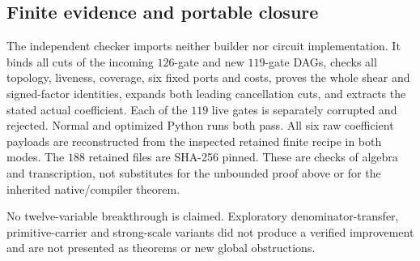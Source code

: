 \subsection{Finite evidence and portable closure}
The independent checker imports neither builder nor circuit implementation.
It binds all cuts of the incoming $126$-gate and new $119$-gate DAGs, checks
all topology, liveness, coverage, six fixed ports and costs, proves the whole
shear and signed-factor identities, expands both leading cancellation cuts,
and extracts the stated actual coefficient. Each of the $119$ live gates is
separately corrupted and rejected. Normal and optimized Python runs both pass.
All six raw coefficient payloads are reconstructed from the inspected retained
finite recipe in both modes. The $188$ retained files are SHA-256 pinned.
These are checks of algebra and transcription, not substitutes for the
unbounded proof above or for the inherited native/compiler theorem.

No twelve-variable breakthrough is claimed. Exploratory denominator-transfer,
primitive-carrier and strong-scale variants did not produce a verified
improvement and are not presented as theorems or new global obstructions.
